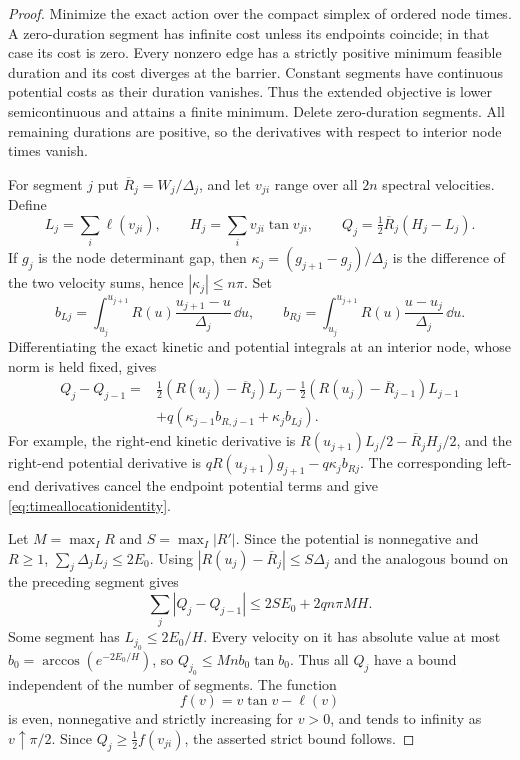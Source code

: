 \begin{proof}
Minimize the exact action over the compact simplex of ordered node
times. A zero-duration segment has infinite cost unless its endpoints
coincide; in that case its cost is zero. Every nonzero edge has a
strictly positive minimum feasible duration and its cost diverges
at the barrier. Constant segments have continuous potential costs
as their duration vanishes. Thus the extended objective is lower
semicontinuous and attains a finite minimum. Delete zero-duration
segments. All remaining durations are positive, so the derivatives
with respect to interior node times vanish.

For segment $j$ put $\overline R_j=W_j/\Delta_j$, and let $v_{ji}$
range over all $2n$ spectral velocities. Define
\[
 L_j=\sum_i\ell(v_{ji}),\qquad H_j=\sum_i v_{ji}\tan v_{ji},
 \qquad Q_j=\tfrac12\overline R_j(H_j-L_j).
\]
If $g_j$ is the node determinant gap, then
$\kappa_j=(g_{j+1}-g_j)/\Delta_j$ is the difference of the two
velocity sums, hence $|\kappa_j|\le n\pi$. Set
\[
 b_{Lj}=\int_{u_j}^{u_{j+1}}R(u)\frac{u_{j+1}-u}{\Delta_j}\,\dd u,
 \qquad
 b_{Rj}=\int_{u_j}^{u_{j+1}}R(u)\frac{u-u_j}{\Delta_j}\,\dd u.
\]
Differentiating the exact kinetic and potential integrals at an
interior node, whose norm is held fixed, gives
\begin{equation}\label{eq:timeallocationidentity}
 \begin{split}
 Q_j-Q_{j-1}={}&\tfrac12(R(u_j)-\overline R_j)L_j
       -\tfrac12(R(u_j)-\overline R_{j-1})L_{j-1}\\
 &+q(\kappa_{j-1}b_{R,j-1}+\kappa_jb_{Lj}).
 \end{split}
\end{equation}
For example, the right-end kinetic derivative is
$R(u_{j+1})L_j/2-\overline R_jH_j/2$, and the right-end potential
derivative is $qR(u_{j+1})g_{j+1}-q\kappa_jb_{Rj}$.
The corresponding left-end derivatives cancel the endpoint potential
terms and give \eqref{eq:timeallocationidentity}.

Let $M=\max_I R$ and $S=\max_I|R'|$. Since the potential is
nonnegative and $R\ge1$, $\sum_j\Delta_jL_j\le2E_0$.
Using $|R(u_j)-\overline R_j|\le S\Delta_j$ and the analogous
bound on the preceding segment gives
\begin{equation}\label{eq:timeallocationvariation}
 \sum_j|Q_j-Q_{j-1}|\le2SE_0+2qn\pi MH.
\end{equation}
Some segment has $L_{j_0}\le 2E_0/H$. Every velocity on it has
absolute value at most $b_0=\arccos(e^{-2E_0/H})$, so
$Q_{j_0}\le Mn b_0\tan b_0$. Thus all $Q_j$ have a bound independent
of the number of segments. The function
\[
 f(v)=v\tan v-\ell(v)
\]
is even, nonnegative and strictly increasing for $v>0$, and tends
to infinity as $v\uparrow\pi/2$. Since
$Q_j\ge\tfrac12 f(v_{ji})$, the asserted strict bound follows.
\end{proof}

